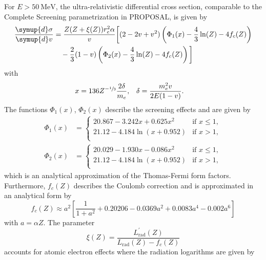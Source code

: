 For $E > \SI{50}{\mega\electronvolt}$, the ultra-relativistic differential cross section, comparable to the Complete Screening parametrization in PROPOSAL, is given by
%
\begin{equation}
	\label{eqn:brems_high}
	\begin{split}
	\frac{\symup{d}\sigma}{\symup{d}v} &= \frac{Z (Z + \xi(Z)) r_e^2 \alpha}{v} \biggl[ (2 - 2 v + v^2) \left( \Phi_1(x) - \frac{4}{3} \ln(Z) - 4 f_c(Z) \right) \\ &\quad- \frac{2}{3} (1 - v) \left( \Phi_2(x) - \frac{4}{3} \ln(Z) - 4 f_c(Z) \right) \biggl]
	\end{split}
\end{equation}
%
with
%
\begin{align}
	x &= 136 Z^{-\sfrac{1}{3}} \frac{2 \delta}{m_e}, & \delta &= \frac{m_e^2 v}{2 E (1 - v)}.
\end{align}
%
The functions $\Phi_1(x)$, $\Phi_2(x)$ describe the screening effects and are given by
%
\begin{align}
	\Phi_1(x) &= 
	\begin{cases}
		20.867 - 3.242 x + 0.625 x^2 & \text{if $x \leq 1$},\\
		21.12 - 4.184 \ln(x + 0.952) & \text{if $x > 1$},\\
	\end{cases}\\
	\Phi_2(x) &= 
	\begin{cases}
		20.029 - 1.930 x - 0.086 x^2 & \text{if $x \leq 1$},\\
		21.12 - 4.184 \ln(x + 0.952) & \text{if $x > 1$},\\
	\end{cases}
\end{align}
%
which is an analytical approximation of the Thomas-Fermi form factors.
Furthermore, $f_c(Z)$ describes the Coulomb correction and is approximated in an analytical form by
%
\begin{equation}
	f_c(Z) \approx a^2 \left[ \frac{1}{1 + a^2} + 0.20206 - 0.0369a^2 + 0.0083 a^4 - 0.002 a^6 \right]
\end{equation}
%
with $a = \alpha Z$.
The parameter 
%
\begin{equation}
	\xi(Z) = \frac{L_\text{rad}^{\prime}(Z)}{L_\text{rad}(Z) - f_c(Z)} 
\end{equation}
%
accounts for atomic electron effects where the radiation logarithms are given by
